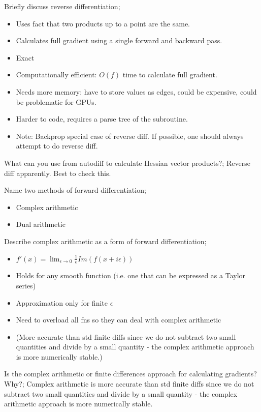 \documentclass{article}
\begin{document}
Briefly discuss reverse differentiation; \begin{itemize} \item Uses fact that two products up to a point are the same. \item Calculates full gradient using a single forward and backward pass.  \item Exact \item Computationally efficient: $O(f)$ time to calculate full gradient.  \item Needs more memory: have to store values as edges, could be expensive, could be problematic for GPUs.  \item Harder to code, requires a parse tree of the subroutine.  \item Note: Backprop special case of reverse diff. If possible, one should always attempt to do reverse diff.  \end{itemize}

What can you use from autodiff to calculate Hessian vector products?; Reverse diff apparently. Best to check this.

Name two methods of forward differentiation; \begin{itemize} \item Complex arithmetic \item Dual arithmetic \end{itemize}

Describe complex arithmetic as a form of forward differentiation; \begin{itemize} \item $f'(x)=\lim_{\epsilon\rightarrow 0}\frac{1}{\epsilon}Im(f(x+i\epsilon))$ \item Holds for any smooth function (i.e. one that can be expressed as a Taylor series) \item Approximation only for finite $\epsilon$ \item Need to overload all fns so they can deal with complex arithmetic \item (More accurate than std finite diffs since we do not subtract two small quantities and divide by a small quantity - the complex arithmetic approach is more numerically stable.) \end{itemize}

Is the complex arithmetic or finite differences approach for calculating gradients? Why?; Complex arithmetic is more accurate than std finite diffs since we do not subtract two small quantities and divide by a small quantity - the complex arithmetic approach is more numerically stable.
\end{document}
